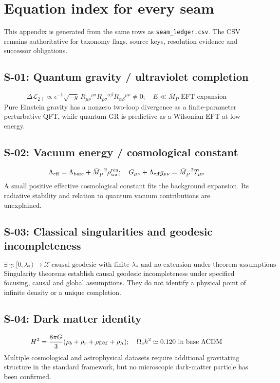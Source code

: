 \section{Equation index for every seam}\label{app:seam-equations}
This appendix is generated from the same rows as \texttt{seam\_ledger.csv}. The CSV remains authoritative for taxonomy flags, source keys, resolution evidence and successor obligations.
\subsection*{S-01: Quantum gravity / ultraviolet completion}
\begingroup\small
\begin{equation*}
\Delta\mathcal L_{2\ell}\propto \epsilon^{-1}\sqrt{-g}\,R_{\mu\nu}{}^{\rho\sigma}R_{\rho\sigma}{}^{\alpha\beta}R_{\alpha\beta}{}^{\mu\nu}\neq0;\allowbreak\quad E\ll\bar M_P\text{ EFT expansion}
\end{equation*}
\endgroup
Pure Einstein gravity has a nonzero two-loop divergence as a finite-parameter perturbative QFT, while quantum GR is predictive as a Wilsonian EFT at low energy.
\subsection*{S-02: Vacuum energy / cosmological constant}
\begingroup\small
\begin{equation*}
\Lambda_{\rm eff}=\Lambda_{\rm bare}+\bar M_P^{-2}\rho_{\rm vac}^{\rm ren};\allowbreak\quad G_{\mu\nu}+\Lambda_{\rm eff}g_{\mu\nu}=\bar M_P^{-2}T_{\mu\nu}
\end{equation*}
\endgroup
A small positive effective cosmological constant fits the background expansion. Its radiative stability and relation to quantum vacuum contributions are unexplained.
\subsection*{S-03: Classical singularities and geodesic incompleteness}
\begingroup\small
\begin{equation*}
\exists\ \gamma:[0,\lambda_*)\to\mathcal X\ \text{causal geodesic with finite }\lambda_*\text{ and no extension under theorem assumptions}
\end{equation*}
\endgroup
Singularity theorems establish causal geodesic incompleteness under specified focusing, causal and global assumptions. They do not identify a physical point of infinite density or a unique completion.
\subsection*{S-04: Dark matter identity}
\begingroup\small
\begin{equation*}
H^2=\frac{8\pi G}{3}(\rho_b+\rho_r+\rho_{\rm DM}+\rho_\Lambda);\allowbreak\quad \Omega_c h^2\simeq0.120\ \text{in base }\Lambda\mathrm{CDM}
\end{equation*}
\endgroup
Multiple cosmological and astrophysical datasets require additional gravitating structure in the standard framework, but no microscopic dark-matter particle has been confirmed.
